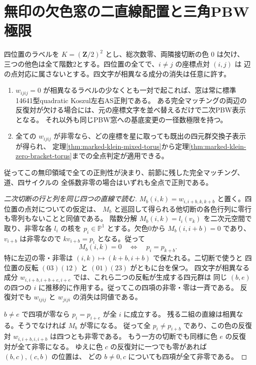 \section{無印の欠色窓の二直線配置と三角PBW極限}
\label{sec:unmarked-klein-pbw}
\begin{theorem}\label{thm:unmarked-klein-pbw}
四位置のラベルを $K=(\mathbf Z/2)^2$ とし、総次数零、両隣接切断の色 $0$ は欠け、
三つの他色は全て階数2とする。四位置の全てで、$i\ne j$ の座標点対 $(i,j)$ は
辺の点対応に属さないとする。四文字が相異なる成分の消失は任意に許す。
\begin{enumerate}
\item $w_{ijij}=0$ が相異なるラベルの少なくとも一対で起これば、窓は常に標準14641型quadratic Koszul左右AS正則である。
ある完全マッチングの両辺の反復対が欠ける場合には、元の座標文字を並べ替えるだけで二次PBW表示となる。
それ以外も同じPBW窓への基底変更の一径数極限を持つ。
\item 全ての $w_{ijij}$ が非零なら、どの座標を星に取っても既出の四元群交換子表示が得られ、
定理\ref{thm:marked-klein-mixed-torus}から定理\ref{thm:marked-klein-zero-bracket-torus}までの全点判定が適用できる。
\end{enumerate}
従ってこの無印領域で全ての正則性が決まり、前節に残した完全マッチング、道、四サイクルの
全係数非零の場合はいずれも全点で正則である。
\end{theorem}
\begin{proof}[二次切断の行と列を同じ四つの直線で読む]
$M_b(i,k)=w_{i,i+b,k,k+b}$ と置く。四位置の点対についての仮定は、
$M_b$ と巡回して得られる他切断の各色行列に零行も零列もないことと同値である。
階数分解 $M_b(i,k)=l_i(v_k)$ を二次元空間で取り、非零な各 $l_i$ の核を
$p_i\in\mathbb P^1$ とする。欠色0から $M_b(i,i+b)=0$ であり、
$v_{i+b}$ は非零なので $kv_{i+b}=p_i$ となる。従って
\[
                 M_b(i,k)=0\quad\Longleftrightarrow\quad p_i=p_{k+b}.
\]
特に左辺の零・非零は $(i,k)\mapsto(k+b,i+b)$ で保たれる。二切断で使うと
四位置の反転 $(03)(12)$ と $(01)(23)$ がともに台を保つ。
四文字が相異なる成分 $w_{i,i+b,i+b+e,i+e}$ では、これら二つの反転が生成する四元群は
同じ $(b,e)$ の四つの $i$ に推移的に作用する。従ってこの四項の非零・零は一斉である。
反復対でも $w_{ijij}$ と $w_{jiji}$ の消失は同値である。

$b\ne e$ で四項が零なら $p_i=p_{i+e}$ が全 $i$ に成立する。
残る二組の直線は相異なる。そうでなければ $M_b$ が零になる。
従って全 $p_i\ne p_{i+b}$ であり、この色の反復対 $w_{i,i+b,i,i+b}$ は四つとも非零である。
もう一方の切断でも同様に色 $e$ の反復対が全て非零になる。
ゆえに色 $c$ の反復対に一つでも零があれば $(b,c),(c,b)$ の位置は、
どの $b\ne0,c$ についても四項が全て非零である。
\end{proof}

